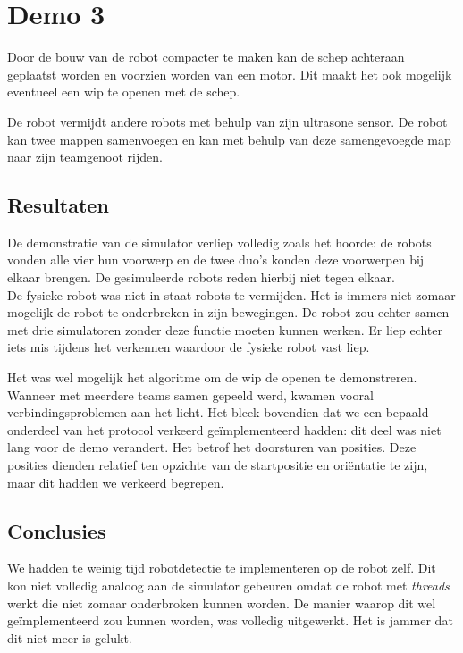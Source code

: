 \documentclass[eind]{penoverslag}
\begin{document}
\section{Demo 3}
\label{Asec:demo3}
Door de bouw van de robot compacter te maken kan de schep achteraan geplaatst worden en voorzien worden van een motor. Dit maakt het ook mogelijk eventueel een wip te openen met de schep.

De robot vermijdt andere robots met behulp van zijn ultrasone sensor. De robot kan twee mappen samenvoegen en kan met behulp van deze samengevoegde map naar zijn teamgenoot rijden.

\subsection{Resultaten}
\label{Assec:result3}
De demonstratie van de simulator verliep volledig zoals het hoorde: de robots vonden alle vier hun voorwerp en de twee duo's konden deze voorwerpen bij elkaar brengen. De gesimuleerde robots reden hierbij niet tegen elkaar.\\

De fysieke robot was niet in staat robots te vermijden. Het is immers niet zomaar mogelijk de robot te onderbreken in zijn bewegingen. De robot zou echter samen met drie simulatoren zonder deze functie moeten kunnen werken. Er liep echter iets mis tijdens het verkennen waardoor de fysieke robot vast liep.

Het was wel mogelijk het algoritme om de wip de openen te demonstreren.\\

Wanneer met meerdere teams samen gepeeld werd, kwamen vooral verbindingsproblemen aan het licht. Het bleek bovendien dat we een bepaald onderdeel van het protocol verkeerd ge\"implementeerd hadden: dit deel was niet lang voor de demo verandert. Het betrof het doorsturen van posities. Deze posities dienden relatief ten opzichte van de startpositie en ori\"entatie te zijn, maar dit hadden we verkeerd begrepen.

\subsection{Conclusies}
\label{Assec:conc3}
We hadden te weinig tijd robotdetectie te implementeren op de robot zelf. Dit kon niet volledig analoog aan de simulator gebeuren omdat de robot met \textit{threads} werkt die niet zomaar onderbroken kunnen worden. De manier waarop dit wel ge\"implementeerd zou kunnen worden, was volledig uitgewerkt. Het is jammer dat dit niet meer is gelukt.
\end{document}
